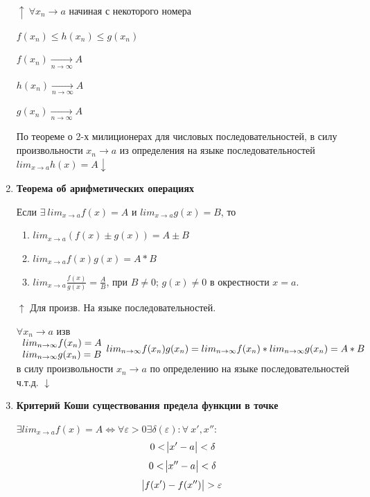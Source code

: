 \documentclass{article}
\begin{document}
\begin{enumerate}
    \(\uparrow\ \forall x_n \rightarrow a\) начиная с некоторого номера
    
    \( f(x_n) \leq h(x_n) \leq g(x_n) \)

    \( f(x_n) \xrightarrow[n \rightarrow \infty]{} A \)

    \( h(x_n) \xrightarrow[n \rightarrow \infty]{} A \)

    \( g(x_n) \xrightarrow[n \rightarrow \infty]{} A \)

    По теореме о 2-х милиционерах для числовых последовательностей, в силу произвольности \(x_n \rightarrow a\) из определения на языке последовательностей \(lim_{x \rightarrow a} h(x) = A \downarrow\)
    
    \item \textbf{Теорема об арифметических операциях}

      Если \(\exists\ lim_{x \rightarrow a} f(x)=A\) и \(lim_{x\rightarrow a} g(x) = B\), то
      \begin{enumerate}
        \item \(lim_{x \rightarrow a}(f(x)\pm g(x))=A\pm B\)
        \item \(lim_{x \rightarrow a} f(x)g(x) = A*B\)
        \item \(lim_{x \rightarrow a} \frac{f(x)}{g(x)} = \frac{A}{B}\), при \(B \neq 0\); \(g(x) \neq 0\) в окрестности \(x=a\).
      \end{enumerate}

      \(\uparrow\) Для произв. На языке последовательностей.

      \(\forall x_n \rightarrow a\) изв \(\begin{array}{l} lim_{n \rightarrow \infty} f(x_n) = A\\ lim_{n \rightarrow \infty} g(x_n) = B\end{array}\\ 
      lim_{n \rightarrow \infty} f(x_n)g(x_n)=lim_{n \rightarrow \infty} f(x_n) * lim_{n \rightarrow \infty} g(x_n)=A*B\)\\
      в силу произвольности \(x_n \rightarrow a\) по определению на языке последовательностей ч.т.д. \(\downarrow\)
  
      \item \textbf{Критерий Коши существования предела функции в точке}
      
      \( \exists lim_{x \rightarrow a} f(x) = A \Leftrightarrow \forall \varepsilon > 0 \exists \delta(\varepsilon): \forall\ x',x'': \)
      \[ 0 < \abs{x' - a} < \delta \]
      \[ 0 < \abs{x'' - a} < \delta \]
      \[ \abs{f(x') - f(x'')} > \varepsilon \]
      

\end{enumerate}
\end{document}
